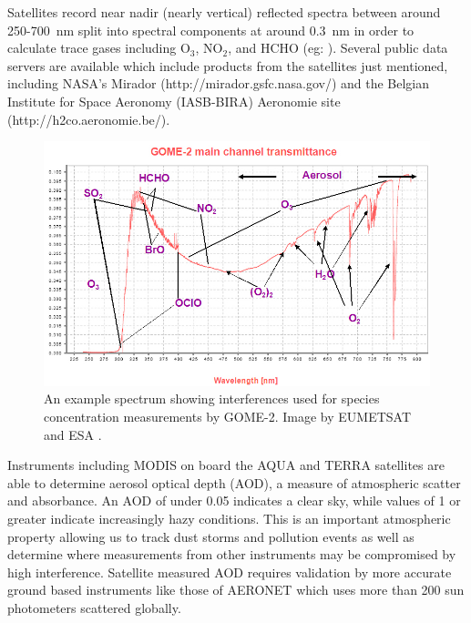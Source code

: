     Satellites record near nadir (nearly vertical) reflected spectra between around 250-700~nm split into spectral components at around $0.3$~nm in order to calculate trace gases including O$_3$, NO$_2$, and HCHO (eg: \citet{Leue2001}).
    Several public data servers are available which include products from the satellites just mentioned, including NASA's Mirador (http://mirador.gsfc.nasa.gov/) and the Belgian Institute for Space Aeronomy (IASB-BIRA) Aeronomie site (http://h2co.aeronomie.be/).
    
    \begin{figure}
      \includegraphics[width=\textwidth]{Figures/GOME_SPECTRUM.jpg}
      \caption{An example spectrum showing interferences used for species concentration measurements by GOME-2. Image by EUMETSAT and ESA \citep{GOME2Image}.}
      \label{LR:fig:gomeproducts}
    \end{figure}
    
    Instruments including MODIS on board the AQUA and TERRA satellites are able to determine aerosol optical depth (AOD), a measure of atmospheric scatter and absorbance. 
    An AOD of under 0.05 indicates a clear sky, while values of 1 or greater indicate increasingly hazy conditions.
    This is an important atmospheric property allowing us to track dust storms and pollution events as well as determine where measurements from other instruments may be compromised by high interference.
    Satellite measured AOD requires validation by more accurate ground based instruments like those of AERONET which uses more than 200 sun photometers scattered globally. 
    
